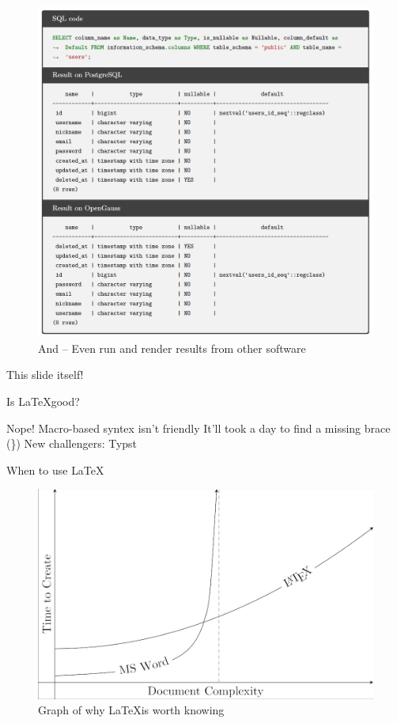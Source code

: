 \documentclass[scheme=plain,aspectratio=169]{ctexbeamer}
\let\OriginLaTeX\LaTeX
\renewcommand\LaTeX{\textrm{\OriginLaTeX\xspace}}
\begin{document}
\begin{frame}
    \begin{figure}[htp]
      \centering
      \includegraphics[width=.5\linewidth]{image1.png}
      \caption{And -- Even run and render results from other software}
    \end{figure}
\end{frame}

\begin{frame}[standout]
    This slide itself!
\end{frame}

\begin{frame}{Is \LaTeX good?}
    \begin{outline}
        \1 Nope!
            \2 Macro-based syntex isn't friendly
            \2 It'll took a day to find a missing brace (\})
        \1 New challengers:
            \2 Typst
    \end{outline}
\end{frame}

\begin{frame}{When to use \LaTeX}
    \begin{figure}[htp]
      \centering
      \includegraphics[width=.6\linewidth]{image2.png}
      \caption{Graph of why \LaTeX is worth knowing}
    \end{figure}
\end{frame}
\end{document}
